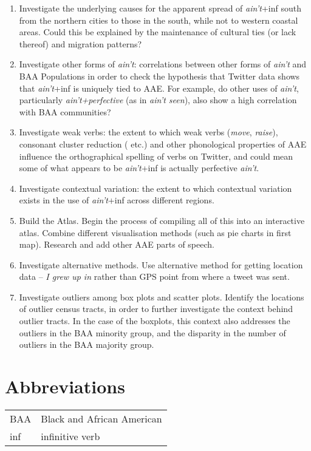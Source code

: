 \documentclass[output=paper,colorlinks,citecolor=brown,draftmode]{langscibook}
\begin{document}
\begin{enumerate}
    \sloppy
	\item Investigate the underlying causes for the apparent spread of \textit{ain't}+inf south from the northern cities to those in the south, while not to western coastal areas. Could this be explained by the maintenance of cultural ties (or lack thereof) and migration patterns?
    \item Investigate other forms of \textit{ain’t}: correlations between other forms of \textit{ain’t} and BAA Populations in order to check the hypothesis that Twitter data shows that \textit{ain't}+inf is uniquely tied to AAE.  For example, do other uses of \textit{ain’t}, particularly \textit{ain't+perfective} (as in \textit{ain't seen}), also show a high correlation with BAA communities?
    \item Investigate weak verbs: the extent to which weak verbs (\textit{move}, \textit{raise}), consonant cluster reduction ( etc.) and other phonological properties of AAE influence the orthographical spelling of verbs on Twitter, and could mean some of what appears to be \textit{ain't}+inf is actually perfective \textit{ain't}.
    \item Investigate contextual variation: the extent to which contextual variation exists in the use of \textit{ain't}+inf across different regions.
    \item Build the Atlas. Begin the process of compiling all of this into an interactive atlas. Combine different visualisation methods (such as pie charts in first map). Research and add other AAE parts of speech.
    \item Investigate alternative methods. Use alternative method for getting location data -- \textit{I grew up in} rather than GPS point from where a tweet was sent.
    \item Investigate outliers among box plots and scatter plots.  Identify the locations of outlier census tracts, in order to further investigate the context behind outlier tracts.  In the case of the boxplots, this context also addresses the outliers in the BAA minority group, and the disparity in the number of outliers in the BAA majority group.
\end{enumerate}

\section*{Abbreviations}
\begin{tabularx}{\textwidth}{@{}lQ@{}}
BAA  & {Black and African American} \\
inf  & {infinitive verb} \\
\end{tabularx}

\printbibliography[heading=subbibliography,notkeyword=this]
\end{document}
